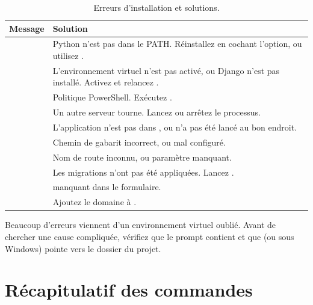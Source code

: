 \begin{table}[htbp]
\centering
\small
\begin{tabularx}{\textwidth}{L{5.1cm} X}
\toprule
\textbf{Message} & \textbf{Solution} \\
\midrule
{} & Python n'est pas dans le PATH. Réinstallez en
cochant l'option, ou utilisez . \\
 & L'environnement virtuel n'est pas activé, ou Django
n'est pas installé. Activez  et relancez . \\
 & Politique PowerShell. Exécutez
. \\
 & Un autre serveur tourne. Lancez
 ou arrêtez le processus. \\
 & L'application n'est pas dans
, ou  n'a pas été lancé au bon endroit. \\
 & Chemin de gabarit incorrect, ou
 mal configuré. \\
 & Nom de route inconnu, ou paramètre manquant. \\
 & Les migrations n'ont pas été appliquées.
Lancez . \\
 &  manquant dans le
formulaire. \\
 & Ajoutez le domaine à . \\
\bottomrule
\end{tabularx}
\caption{Erreurs d'installation et solutions.}
\end{table}

\begin{piege}
Beaucoup d'erreurs viennent d'un environnement virtuel oublié. Avant de chercher
une cause compliquée, vérifiez que le prompt contient  et que
 (ou  sous Windows) pointe vers le dossier du
projet.
\end{piege}

\section{Récapitulatif des commandes}

